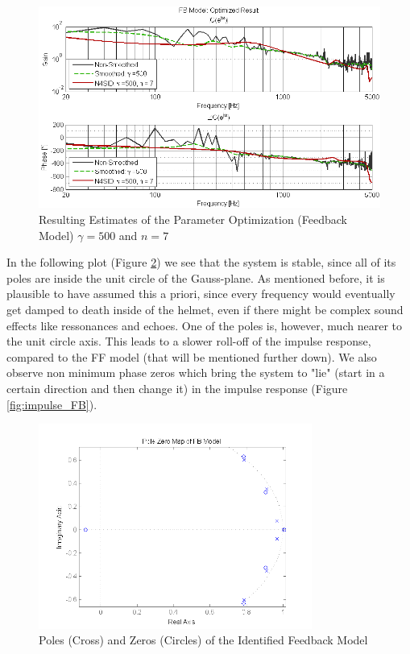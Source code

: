 \begin{figure}[h]
\centering
\includegraphics[width=1.0\textwidth]{pics/results_FB}
\caption{Resulting Estimates of the Parameter Optimization (Feedback Model)  $\gamma = 500$ and $n = 7$}
\label{fig:results_FB}
\end{figure}

In the following plot (Figure \ref{fig:pole_FB}) we see that the system is stable, since all of its poles are inside the unit circle of the Gauss-plane. As mentioned before, it is plausible to have assumed this a priori, since every frequency would eventually get damped to death inside of the helmet, even if there might be complex sound effects like ressonances and echoes. One of the poles is, however, much nearer to the unit circle axis. This leads to a slower roll-off of the impulse response, compared to the FF model (that will be mentioned further down). We also observe non minimum phase zeros which bring the system to "lie" (start in a certain direction and then change it) in the impulse response (Figure \ref{fig:impulse_FB}).\\

\begin{figure}[h]
\centering
\includegraphics[width=0.8\textwidth]{pics/pole_FB}
\caption{Poles (Cross) and Zeros (Circles) of the Identified Feedback Model}
\label{fig:pole_FB}
\end{figure}

